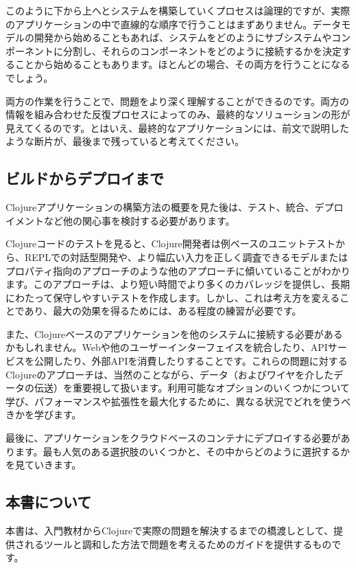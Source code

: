 このように下から上へとシステムを構築していくプロセスは論理的ですが、実際のアプリケーションの中で直線的な順序で行うことはまずありません。データモデルの開発から始めることもあれば、システムをどのようにサブシステムやコンポーネントに分割し、それらのコンポーネントをどのように接続するかを決定することから始めることもあります。ほとんどの場合、その両方を行うことになるでしょう。

両方の作業を行うことで、問題をより深く理解することができるのです。両方の情報を組み合わせた反復プロセスによってのみ、最終的なソリューションの形が見えてくるのです。とはいえ、最終的なアプリケーションには、前文で説明したような断片が、最後まで残っていると考えてください。


\subsection{ビルドからデプロイまで}

Clojureアプリケーションの構築方法の概要を見た後は、テスト、統合、デプロイメントなど他の関心事を検討する必要があります。

Clojureコードのテストを見ると、Clojure開発者は例ベースのユニットテストから、REPLでの対話型開発や、より幅広い入力を正しく調査できるモデルまたはプロパティ指向のアプローチのような他のアプローチに傾いていることがわかります。このアプローチは、より短い時間でより多くのカバレッジを提供し、長期にわたって保守しやすいテストを作成します。しかし、これは考え方を変えることであり、最大の効果を得るためには、ある程度の練習が必要です。

また、Clojureベースのアプリケーションを他のシステムに接続する必要があるかもしれません。Webや他のユーザーインターフェイスを統合したり、APIサービスを公開したり、外部APIを消費したりすることです。これらの問題に対するClojureのアプローチは、当然のことながら、データ（およびワイヤを介したデータの伝送）を重要視して扱います。利用可能なオプションのいくつかについて学び、パフォーマンスや拡張性を最大化するために、異なる状況でどれを使うべきかを学びます。

最後に、アプリケーションをクラウドベースのコンテナにデプロイする必要があります。最も人気のある選択肢のいくつかと、その中からどのように選択するかを見ていきます。


\subsection{本書について}

本書は、入門教材からClojureで実際の問題を解決するまでの橋渡しとして、提供されるツールと調和した方法で問題を考えるためのガイドを提供するものです。

